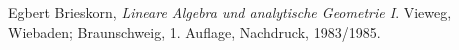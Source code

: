\begin{thebibliography}{123}

  Egbert Brieskorn,
  \emph{Lineare Algebra und analytische Geometrie I}.
  Vieweg, Wiebaden; Braunschweig,
  1. Auflage, Nachdruck,
  1983/1985.

\end{thebibliography}
